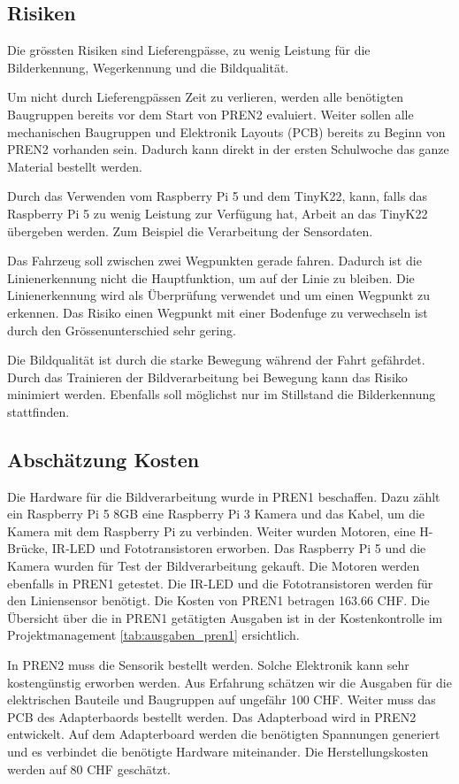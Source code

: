 \documentclass[../main.tex]{subfiles}
\begin{document}
\newpage
\subsection{Risiken}
Die grössten Risiken sind Lieferengpässe, zu wenig Leistung für die Bilderkennung, Wegerkennung und die Bildqualität. 

Um nicht durch Lieferengpässen Zeit zu verlieren, werden alle benötigten Baugruppen bereits vor dem Start von PREN2 evaluiert. Weiter sollen alle mechanischen Baugruppen und Elektronik Layouts (PCB) bereits zu Beginn von PREN2 vorhanden sein. Dadurch kann direkt in der ersten Schulwoche das ganze Material bestellt werden.

Durch das Verwenden vom Raspberry Pi 5 und dem TinyK22, kann, falls das Raspberry Pi 5 zu wenig Leistung zur Verfügung hat, Arbeit an das TinyK22 übergeben werden. Zum Beispiel die Verarbeitung der Sensordaten. 

Das Fahrzeug soll zwischen zwei Wegpunkten gerade fahren. Dadurch ist die Linienerkennung nicht die Hauptfunktion, um auf der Linie zu bleiben. Die Linienerkennung wird als Überprüfung verwendet und um einen Wegpunkt zu erkennen. Das Risiko einen Wegpunkt mit einer Bodenfuge zu verwechseln ist durch den Grössenunterschied sehr gering. 

Die Bildqualität ist durch die starke Bewegung während der Fahrt gefährdet. Durch das Trainieren der Bildverarbeitung bei Bewegung kann das Risiko minimiert werden. Ebenfalls soll möglichst nur im Stillstand die Bilderkennung stattfinden. 

\subsection{Abschätzung Kosten}
Die Hardware für die Bildverarbeitung wurde in PREN1 beschaffen. Dazu zählt ein Raspberry Pi 5 8GB eine Raspberry Pi 3 Kamera und das Kabel, um die Kamera mit dem Raspberry Pi zu verbinden. Weiter wurden Motoren, eine H-Brücke, IR-LED und Fototransistoren erworben. Das Raspberry Pi 5 und die Kamera wurden für Test der Bildverarbeitung gekauft. Die Motoren werden ebenfalls in PREN1 getestet. Die IR-LED und die Fototransistoren werden für den Liniensensor benötigt. Die Kosten von PREN1 betragen 163.66 CHF. Die Übersicht über die in PREN1 getätigten Ausgaben ist in der Kostenkontrolle im Projektmanagement \ref{tab:ausgaben_pren1} ersichtlich. 

In PREN2 muss die Sensorik bestellt werden. Solche Elektronik kann sehr kostengünstig erworben werden. Aus Erfahrung schätzen wir die Ausgaben für die elektrischen Bauteile und Baugruppen auf ungefähr 100 CHF. Weiter muss das PCB des Adapterbaords bestellt werden. Das Adapterboad wird in PREN2 entwickelt. Auf dem Adapterboard werden die benötigten Spannungen generiert und es verbindet die benötigte Hardware miteinander. Die Herstellungskosten werden auf 80 CHF geschätzt.
\end{document}
